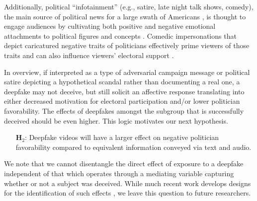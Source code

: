 \documentclass[12pt,letterpaper]{article}
\begin{document}
Additionally, political ``infotainment'' (e.g., satire, late night talk shows, comedy), the main source of political news for a large swath of Americans \citep{pew2016election}, is thought to engage audiences by cultivating both positive and negative emotional attachments to political figures and concepts \citep{baymbeyond, boukes2015odds}. Comedic impersonations that depict caricatured negative traits of politicians effectively prime viewers of those traits and can also influence viewers' electoral support \citep{esralew2012influence}.
 
In overview, if interpreted as a type of adversarial campaign message or political satire depicting a hypothetical scandal rather than documenting a real one, a deepfake may not deceive, but still solicit an affective response translating into either decreased motivation for electoral participation and/or lower politician favorability. The effects of deepfakes amongst the subgroup that is successfully deceived should be even higher. This logic motivates our next hypothesis.


\begin{itemize}
    \item[\textbf{H$_2$}:] Deepfake videos will have a larger effect on negative politician favorability compared to equivalent information conveyed via text and audio.
\end{itemize}

We note that we cannot disentangle the direct effect of exposure to a deepfake independent of that which operates through a mediating variable capturing whether or not a subject was deceived. While much recent work develops designs for the identification of such effects \citep{imai2011}, we leave this question to future researchers.







% 

\end{document}
